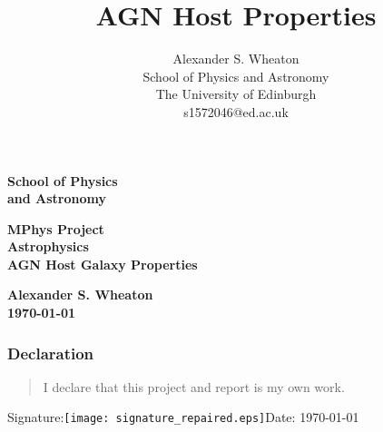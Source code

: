\documentclass[a4paper,11pt]{article}
\title{AGN Host Properties}
\author{
    Alexander S. Wheaton\\
    School of Physics and Astronomy\\
    The University of Edinburgh\\
    s1572046@ed.ac.uk\break
}
\begin{document}
\thispagestyle{empty}                   %
\epsfxsize=40mm                         %
\begin{minipage}[b]{110mm}
    {\Huge\bf School of Physics\\ and Astronomy
    \vspace*{17mm}}
\end{minipage}
\hfill
\begin{minipage}[t]{40mm}
\end{minipage}
\par\noindent                                           %
\vspace*{2cm}
\begin{center}
    \Large\bf \Large\bf MPhys Project\\
    \Large\bf Astrophysics\\[10pt]                     %
    \LARGE\bf AGN Host Galaxy Properties
\end{center}
\vspace*{0.5cm}
\begin{center}
    \bf Alexander S. Wheaton\\
    \today
\end{center}
\vspace*{5mm}

\begin{abstract}
    \lipsum[1]
\end{abstract}

\vspace*{1cm}

\subsubsection*{Declaration}
\begin{quotation}
    I declare that this project and report is my own work.
\end{quotation}

\hspace*{1cm}Signature:\hspace*{1cm}\texttt{[image: signature\_repaired.eps]}\hspace*{1cm}Date: \today
\end{document}
